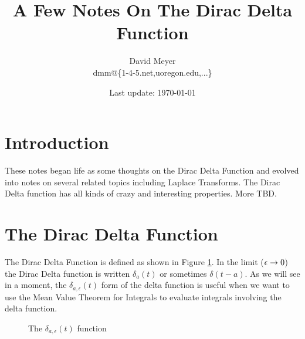 \documentclass{article}
\title{A Few Notes On The Dirac Delta Function}
\author{David Meyer \\ dmm@\{1-4-5.net,uoregon.edu,...\}}
\date{Last update: \today}							%
\begin{document}
\maketitle

\section{Introduction}
These notes began life as some thoughts on the Dirac Delta Function and evolved into notes on several related topics including  Laplace Transforms. The 
Dirac Delta function has all kinds of crazy and interesting properties. More TBD.

\section{The Dirac Delta Function}
The Dirac Delta Function is defined as shown in Figure \ref{fig:delta}. In the limit ($\mathlarger{\epsilon} \to 0$) the
 Dirac Delta function is written $\delta_a(t)$ or sometimes $\delta(t - a)$. As we will see in a moment, the $\delta_{a,\epsilon}(t)$ form of the delta function
 is useful when we want to use the Mean Value Theorem for Integrals \cite{wiki:meam_value_theorem_for_integrals} to evaluate integrals involving the delta function.
 
\bigskip

\begin{figure}[H]
  \centering
  \caption{The $\delta_{a,\epsilon}(t)$ function}
  \label{fig:delta}
\end{figure}
\end{document}
